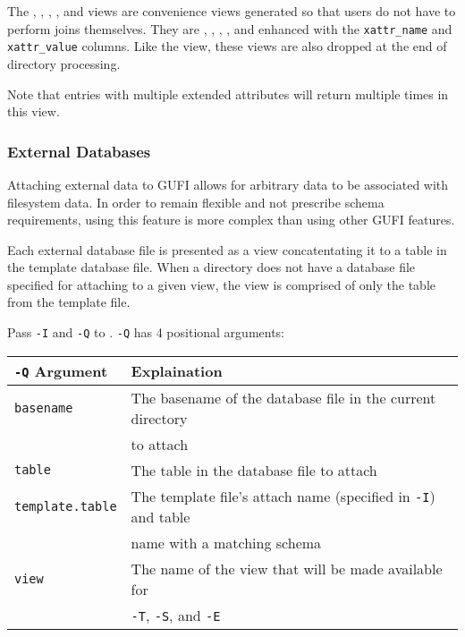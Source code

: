The \xentries, \xpentries, \xsummary, \vrxpentries, and \vrxsummary
views are convenience views generated so that users do not have to
perform joins themselves. They are \entries, \pentries, \summary,
\vrpentries, and \vrsummary enhanced with the \texttt{xattr\_name} and
\texttt{xattr\_value} columns. Like the \xattrs view, these views are
also dropped at the end of directory processing.

Note that entries with multiple extended attributes will return
multiple times in this view.

\subsubsection{External Databases}
Attaching external data to GUFI allows for arbitrary data to be
associated with filesystem data. In order to remain flexible and not
prescribe schema requirements, using this feature is more complex than
using other GUFI features.

Each external database file is presented as a view concatentating it
to a table in the template database file. When a directory does not
have a database file specified for attaching to a given view, the view
is comprised of only the table from the template file.

Pass \texttt{-I} and \texttt{-Q} to \gufiquery. \texttt{-Q} has 4
positional arguments:

\begin{table}[h!]
  \centering
  \begin{tabular}{|l|l|}
    \hline
    \texttt{-Q} Argument & Explaination \\
    \hline
    \texttt{basename} & The basename of the database file in the current directory \\
                      & to attach \\
    \hline
    \texttt{table} & The table in the database file to attach \\
    \hline
    \texttt{template.table} & The template file's attach name (specified in \texttt{-I}) and table \\
                            & name with a matching schema \\
    \hline
    \texttt{view} & The name of the view that will be made available for \\
                  & \texttt{-T}, \texttt{-S}, and \texttt{-E} \\
    \hline
  \end{tabular}
\end{table}


